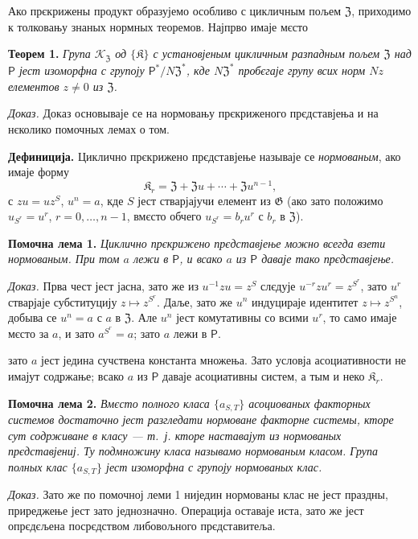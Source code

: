 \documentclass[11pt]{article}
\begin{document}
Ако прєкрижены продукт образујемо особливо с цикличным пољем \(\mathfrak Z\), приходимо к толковању знаных нормных теоремов. Најпрво имаје мєсто

\noindent\textbf{Теорем 1.} \emph{Група \(\mathscr K_{\mathfrak Z}\) од \(\{\mathfrak K\}\) с установјеным цикличным разпадным пољем \(\mathfrak Z\) над \(\mathsf{P}\) јест изоморфна с групоју \(\mathsf{P}^*/N\mathfrak Z^*\), кде \(N\mathfrak Z^*\) пробєгаје групу всих норм \(Nz\) елементов \(z\neq0\) из \(\mathfrak Z\).}

\noindent\emph{Доказ.} Доказ основываје се на нормовању прєкриженого прєдставјења и на нєколико помочных лемах о том.

\noindent\textbf{Дефиниција.} Циклично прєкрижено прєдставјење называје се \emph{нормованым}, ако имаје форму
\[
\mathfrak K_r=\mathfrak Z+\mathfrak Zu+\cdots+\mathfrak Zu^{n-1},
\]
с \(zu=uz^S\), \(u^n=a\), кде \(S\) јест стварјајучи елемент из \(\mathfrak G\) (ако зато положимо \(u_{S^r}=u^r\), \(r=0,\ldots,n-1\), вмєсто обчего \(u_{S^r}=b_ru^r\) с \(b_r\) в \(\mathfrak Z\)).

\noindent\textbf{Помочна лема 1.} \emph{Циклично прєкрижено прєдставјење можно всегда взети нормованым. При том \(a\) лежи в \(\mathsf{P}\), и всако \(a\) из \(\mathsf{P}\) даваје тако прєдставјење.}

\noindent\emph{Доказ.} Прва чест јест јасна, зато же из \(u^{-1}zu=z^S\) слєдује \(u^{-r}zu^r=z^{S^r}\), зато \(u^r\) стварјаје субституцију \(z\mapsto z^{S^r}\). Даље, зато же \(u^n\) индуцираје идентитет \(z\mapsto z^{S^n}\), добыва се \(u^n=a\) с \(a\) в \(\mathfrak Z\). Але \(u^n\) јест комутативны со всими \(u^r\), то само имаје мєсто за \(a\), и зато \(a^{S^r}=a\); зато \(a\) лежи в \(\mathsf{P}\).

зато \(a\) јест једина сучствена константа множења. Зато условја асоциативности не имајут содржање; всако \(a\) из \(\mathsf{P}\) даваје асоциативны систем, а тым и неко \(\mathfrak K_r\).

\noindent\textbf{Помочна лема 2.} \emph{Вмєсто полного класа \(\{a_{S,T}\}\) асоциованых факторных системов достаточно јест разгледати нормоване факторне системы, кторе сут содрживане в класу --- т.~ј. кторе наставајут из нормованых прєдставјениј. Ту подмножину класа называмо нормованым класом. Група полных клас \(\{a_{S,T}\}\) јест изоморфна с групоју нормованых клас.}

\noindent\emph{Доказ.} Зато же по помочној леми 1 ниједин нормованы клас не јест праздны, приреджење јест зато једнозначно. Операција оставаје иста, зато же јест опрєдєљена посрєдством либовољного прєдставитеља.
\end{document}
